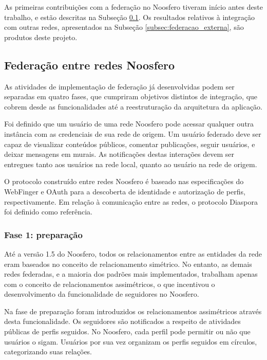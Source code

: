 As primeiras contribuições com a federação no Noosfero tiveram início antes deste
trabalho, e estão descritas na Subseção \ref{subsec:federacao_noosfero}. Os
resultados relativos à integração com outras redes, apresentados na Subseção
\ref{subsec:federacao_externa}, são produtos deste projeto.


\subsection{Federação entre redes Noosfero}
\label{subsec:federacao_noosfero}

As atividades de implementação de federação já desenvolvidas podem ser separadas em
quatro fases, que cumpriram objetivos distintos de integração, que cobrem desde as
funcionalidades até a reestruturação da arquitetura da aplicação.

Foi definido que um usuário de uma rede Noosfero pode acessar qualquer outra
instância com as credenciais de sua rede de origem. Um usuário federado deve ser
capaz de visualizar conteúdos públicos, comentar publicações, seguir usuários, e
deixar mensagens em murais. As notificações destas interações devem ser entregues
tanto aos usuários na rede local, quanto ao usuário na rede de origem.

O protocolo construído entre redes Noosfero é baseado nas especificações do
WebFinger e OAuth para a descoberta de identidade e autorização de perfis,
respectivamente. Em relação à comunicação entre as redes, o protocolo Diaspora foi
definido como referência. 

\subsubsection{Fase 1: preparação}

Até a versão 1.5 do Noosfero, todos os relacionamentos entre as entidades da rede
eram baseados no conceito de relacionamento simétrico. No entanto, as demais redes
federadas, e a maioria dos padrões mais implementados, trabalham apenas com o
conceito de relacionamentos assimétricos, o que incentivou o desenvolvimento da
funcionalidade de seguidores no Noosfero.

Na fase de preparação foram introduzidos os relacionamentos assimétricos através
desta funcionalidade. Os seguidores são notificados a respeito de atividades
públicas de perfis seguidos. No Noosfero, cada perfil pode permitir ou não que
usuários o sigam. Usuários por sua vez organizam os perfis seguidos em círculos,
categorizando suas relações.

